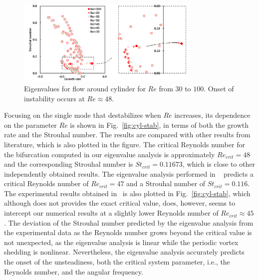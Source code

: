\documentclass[journal,final]{new-aiaa}
\begin{document}
\begin{figure}[htb]
	\centering   
	\includegraphics[width=0.78\textwidth]{cylinder-eigenvalue.png}
	\caption{Eigenvalues for flow around cylinder
		for $Re$ from $30$ to $100$. Onset of instability occurs
	at $Re\approx 48$.  }
	\label{fig:cyl-eigen}
\end{figure}

Focusing on the single mode that destabilizes when $Re$ increases, its
dependence on the parameter $Re$ is shown in Fig.~\ref{fig:cyl-stab},
in terms of both the growth rate and the Strouhal number. The results
are compared with other results from literature, which is also plotted
in the figure. The critical Reynolds number for the bifurcation computed
in our eigenvalue analysis is approximately $Re_{crit}=48$ and the corresponding
Strouhal number is $St_{crit}=0.11673$, which is close to other independently
obtained results. The eigenvalue analysis performed in ~\cite{Crouch2007Predicting} predicts a critical Reynolds number of $Re_{crit}=47$ and a Strouhal number of
$St_{crit}=0.116$. The experimental results obtained in~\cite{C1989Oblique}
is also plotted in Fig.~\ref{fig:cyl-stab}, which although does not
provides the exact critical value, does, however, seems to intercept our
numerical results at a slightly lower Reynolds number of $Re_{crit} \approx 45$.
The deviation of the Strouhal number predicted by the eigenvalue analysis
from the experimental data as the Reynolds number grows beyond the critical
value is not unexpected, as the eigenvalue analysis is linear while the
periodic vortex shedding is nonlinear. Nevertheless, the eigenvalue analysis
accurately predicts the onset of the unsteadiness, both the critical system
parameter, i.e., the Reynolds number, and the angular frequency.
\end{document}
